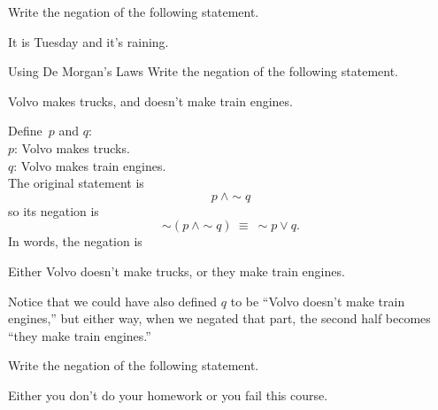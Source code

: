 \begin{try}
Write the negation of the following statement.
\begin{center}
It is Tuesday and it's raining.
\end{center}
\end{try}
\vfill
\pagebreak

\begin{example}[https://www.youtube.com/watch?v=182w7AGeUao]{Using De Morgan's Laws}
Write the negation of the following statement.
\begin{center}
Volvo makes trucks, and doesn't make train engines.
\end{center}

Define\sol\ $p$ and $q$:\\
$p$: Volvo makes trucks.\\
$q$: Volvo makes train engines.\\

The original statement is \[p\ \wedge \sim q\] so its negation is 
\[\sim (p\ \wedge \sim q)\ \equiv\ \sim p \vee q.\]
In words, the negation is
\begin{center}
Either Volvo doesn't make trucks, or they make train engines.
\end{center}

Notice that we could have also defined $q$ to be ``Volvo doesn't make train engines,'' but either way, when we negated that part, the second half becomes ``they make train engines.''
\end{example}

\begin{try}
Write the negation of the following statement.
\begin{center}
Either you don't do your homework or you fail this course.
\end{center}
\end{try}

